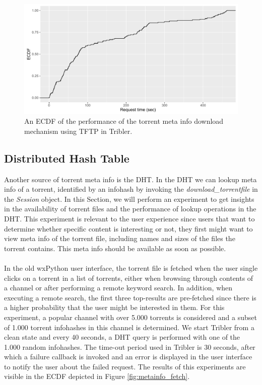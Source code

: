 \begin{figure}[!h]
	\centering
	\includegraphics[width=0.9\columnwidth]{images/experiments/tftp_performance}
	\caption{An ECDF of the performance of the torrent meta info download mechanism using TFTP in Tribler.}
	\label{fig:tftp-performance-success}
\end{figure}

\subsection{Distributed Hash Table}
\label{subsec:dht-experiment}
Another source of torrent meta info is the DHT. In the DHT we can lookup meta info of a torrent, identified by an infohash by invoking the \emph{download\_torrentfile} in the \emph{Session} object. In this Section, we will perform an experiment to get insights in the availability of torrent files and the performance of lookup operations in the DHT. This experiment is relevant to the user experience since users that want to determine whether specific content is interesting or not, they first might want to view meta info of the torrent file, including names and sizes of the files the torrent contains. This meta info should be available as soon as possible.\\\\
In the old wxPython user interface, the torrent file is fetched when the user single clicks on a torrent in a list of torrents, either when browsing through contents of a channel or after performing a remote keyword search. In addition, when executing a remote search, the first three top-results are pre-fetched since there is a higher probability that the user might be interested in them. For this experiment, a popular channel with over 5.000 torrents is considered and a subset of 1.000 torrent infohashes in this channel is determined. We start Tribler from a clean state and every 40 seconds, a DHT query is performed with one of the 1.000 random infohashes. The time-out period used in Tribler is 30 seconds, after which a failure callback is invoked and an error is displayed in the user interface to notify the user about the failed request. The results of this experiments are visible in the ECDF depicted in Figure \ref{fig:metainfo_fetch}.\\

